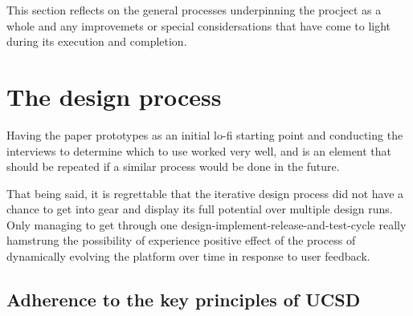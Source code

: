 
This section reflects on the general processes underpinning the procject as a
whole and any improvemets or special considersations that have come to light
during its execution and completion.
%

%
%

\section{The design process}

  Having the paper prototypes as an initial lo-fi starting point and conducting
  the interviews to determine which to use worked very well, and is an element
  that should be repeated if a similar process would be done in the future.

  That being said, it is regrettable that the iterative design process did not
  have a chance to get into gear and display its full potential over multiple
  design runs. Only managing to get through one
  design-implement-release-and-test-cycle really hamstrung the possibility of
  experience positive effect of the process of dynamically evolving the
  platform over time in response to user feedback.

  \subsection{Adherence to the key principles of UCSD}

